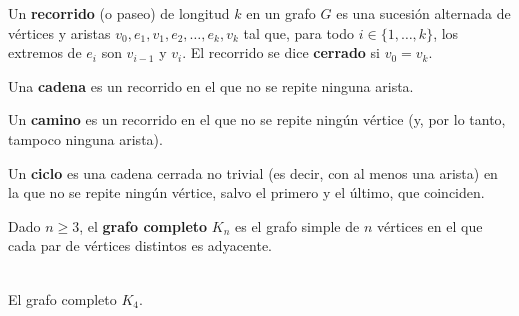 \begin{definition}\label{def:recorrido}
    Un \textbf{recorrido} (o paseo) de longitud \( k \) en un grafo \( G \) es una sucesión alternada de vértices y aristas \( v_0, e_1, v_1, e_2, \ldots, e_k, v_k \) tal que, para todo \( i \in \{1, \ldots, k\} \), los extremos de \( e_i \) son \( v_{i-1} \) y \( v_i \). El recorrido se dice \textbf{cerrado} si \( v_0 = v_k \).
\end{definition}

\begin{definition}\label{def:cadena}
    Una \textbf{cadena} es un recorrido en el que no se repite ninguna arista.
\end{definition}

\begin{definition}\label{def:camino}
    Un \textbf{camino} es un recorrido en el que no se repite ningún vértice (y, por lo tanto, tampoco ninguna arista).
\end{definition}

\begin{definition}\label{def:ciclo}
    Un \textbf{ciclo} es una cadena cerrada no trivial (es decir, con al menos una arista) en la que no se repite ningún vértice, salvo el primero y el último, que coinciden.
\end{definition}

\begin{definition}\label{def:k4}
    Dado \( n \geq 3 \), el \textbf{grafo completo} \( K_n \) es el grafo simple de \( n \) vértices en el que cada par de vértices distintos es adyacente.
\end{definition}

\begin{center}
    \\[.25cm]
    El grafo completo \( K_4 \).
\end{center}

